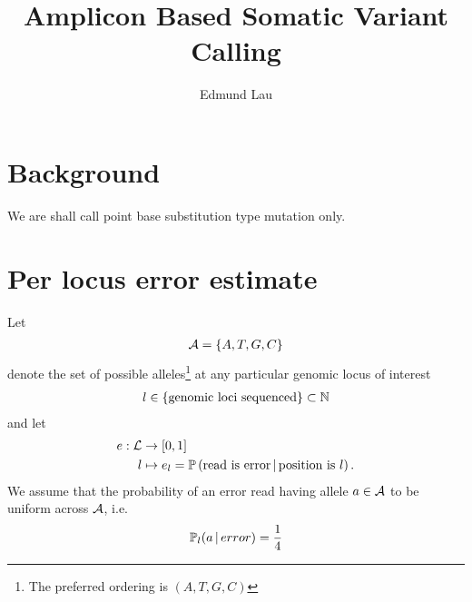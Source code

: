 \documentclass{article}
\title{Amplicon Based Somatic Variant Calling}
\author{Edmund Lau}
\date{}
\begin{document}
\maketitle
\section{Background}
We are shall call point base substitution type mutation only. 


\section{Per locus error estimate}
Let 
\begin{align*}
	{\ensuremath {\cal A}} = \left\{A, T, G, C\right\}
\end{align*}
denote the set of possible alleles\footnote{The preferred ordering is $(A, T, G, C)$} at any particular genomic locus of interest 
\begin{align*}
	l \in \left\{\text{genomic loci sequenced}\right\} \subset {\ensuremath {\mathbb N}}
\end{align*}
and let 
\begin{align*}
e : {\cal{L}} &\to [0, 1] \\
l &\mapsto e_l = {\mathbb P}\left(\text{read is error} \, \vert \, \text{position is $l$}\right). 
\end{align*}
We assume that the probability of an error read having allele $a \in {\ensuremath {\cal A}}$ to be uniform across ${\cal A}$, i.e. 
\begin{align*}
{\ensuremath {\mathbb P}}_l(a \, \vert \, error ) = \frac{1}{4}
\end{align*}
\end{document}
